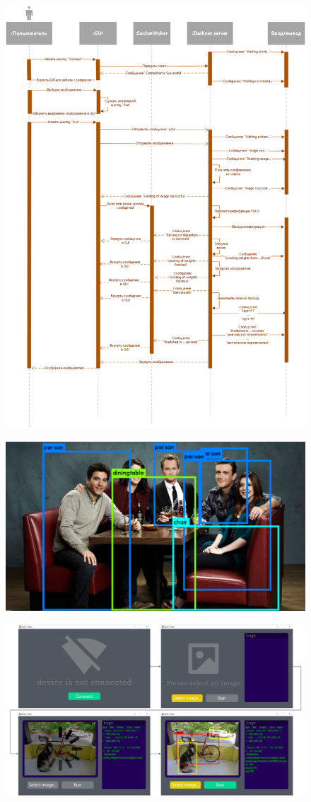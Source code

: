 \documentclass[a4paper,english]{G2-105}
\begin{document}
\begin{figure} 
\begin{center}
\includegraphics[width = 0.8 \linewidth]{sequence.png}
\end{center}
\end{figure}

\begin{figure} 
\includegraphics[width = \linewidth]{photo.png}
\end{figure}

	\begin{figure}
		\includegraphics[width=\linewidth]{screens.png}
	\end{figure}
\end{document}
